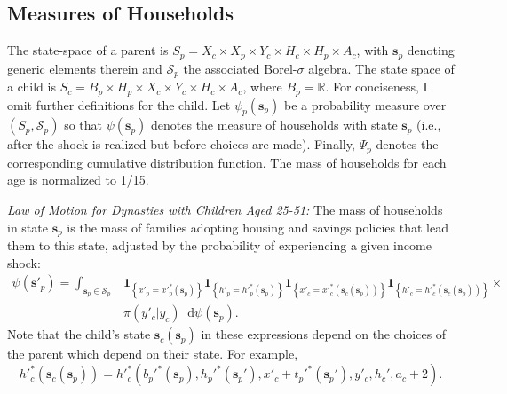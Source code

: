 \documentclass[12pt]{article}
\newcommand*\diff{\mathop{}\!\mathrm{d}}
\newcommand{\mc}{\mathcal}
\begin{document}
\subsection{Measures of Households}\label{sec:hhmeasures}
The state-space of a parent is $S_p = X_c \times X_p \times Y_c \times H_c \times H_p \times A_c$, with $\mathbf{s}_p$ denoting generic elements therein and $\mc{S}_p$ the associated Borel-$\sigma$ algebra. The state space of a child is $S_c= B_p \times H_p \times X_c \times Y_c \times H_c \times A_c$, where $B_p=\mathbb{R}$. For conciseness, I omit further definitions for the child. Let $\psi_p(\mathbf s_p)$ be a probability measure over $(S_p,\mc{S}_p)$ so that $\psi(\mathbf s_p)$ denotes the measure of households with state $\mathbf s_p$ (i.e., after the shock is realized but before choices are made). Finally, $\Psi_p$ denotes the corresponding cumulative distribution function. The mass of households for each age is normalized to 1/15.

\textit{Law of Motion for Dynasties with Children Aged 25-51:} The mass of households in state $\mathbf{s}_p$ is the mass of families adopting housing and savings policies that lead them to this state, adjusted by the probability of experiencing a given income shock:
\begin{equation}\label{eq:LoM}
\begin{split}
\psi(\mathbf{s}'_p) = \int_{\mathbf{s}_p\in \mathcal{S}_p} & 
\mathbf{1}_{\left\{ x'_p = x'^*_p(\mathbf s_p) \right\} }
\mathbf{1}_{\left\{ h'_p = h'^*_p(\mathbf s_p) \right\} } 
\mathbf{1}_{\left\{ x'_c = x'^*_c(\mathbf s_c(\mathbf s_p))\right\}} 
\mathbf{1}_{\left\{ h'_c = h'^*_c(\mathbf s_c(\mathbf s_p))\right\}} \times \\
&\pi(y'_c|y_c)\diff \psi(\mathbf s_p).
\end{split}
\end{equation}
Note that the child's state $\mathbf{s}_c(\mathbf{s}_p)$ in these expressions depend on the choices of the parent which depend on their state. For example, 
\begin{equation}
h'^*_c\left(\mathbf s_c(\mathbf s_p)\right) =h'^*_c\left(b_p'^*(\mathbf{s}_p),h_p'^*(\mathbf{s}_p'),x'_c + t_p'^*(\mathbf{s}_p'),y'_c,h_c',a_c+2 \right).
\end{equation}
\end{document}
